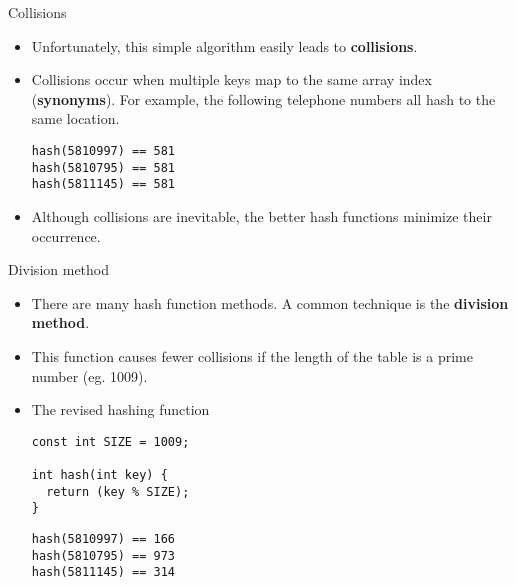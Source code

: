 \documentclass{beamer}
\begin{document}

\begin{frame}[fragile]{Collisions}

\begin{itemize}

\item Unfortunately, this simple algorithm easily leads to \textbf{collisions}.

\item Collisions occur when multiple keys map to the same array index
  (\textbf{synonyms}). For example, the following telephone numbers
  all hash to the same location.

\begin{center}
\lstinline$hash(5810997) == 581$ \\ 
\lstinline$hash(5810795) == 581$ \\ 
\lstinline$hash(5811145) == 581$ \\
\end{center}


\item Although collisions are inevitable, the better hash functions
  minimize their occurrence.

\end{itemize}

\end{frame}


\begin{frame}[fragile]{Division method}

\begin{itemize}

\item There are many hash function methods.  A common technique is the
  \textbf{division method}.

\item This function causes fewer collisions if the length of the table
  is a prime number (eg. 1009).

\item The revised hashing function

\begin{lstlisting}[numbers=none]
const int SIZE = 1009;

int hash(int key) {
  return (key % SIZE);
}
\end{lstlisting}

\begin{center}
\lstinline$hash(5810997) == 166$ \\ 
\lstinline$hash(5810795) == 973$ \\ 
\lstinline$hash(5811145) == 314$ \\
\end{center}

\end{itemize}

\end{frame}
\end{document}
